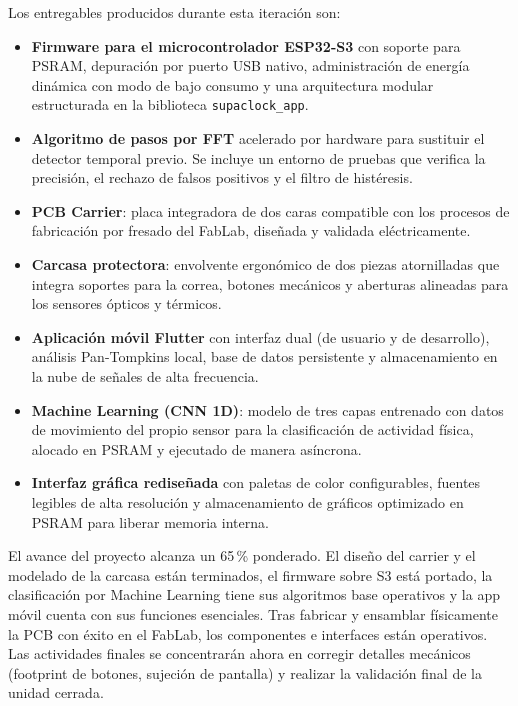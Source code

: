 \documentclass[letterpaper,11pt]{article}
\begin{document}
Los entregables producidos durante esta iteración son:
\begin{itemize}
    \item \textbf{Firmware para el microcontrolador ESP32-S3} con soporte para PSRAM, depuración por puerto USB nativo, administración de energía dinámica con modo de bajo consumo y una arquitectura modular estructurada en la biblioteca \texttt{supaclock\_app}.
    \item \textbf{Algoritmo de pasos por FFT} acelerado por hardware para sustituir el detector temporal previo. Se incluye un entorno de pruebas que verifica la precisión, el rechazo de falsos positivos y el filtro de histéresis.
    \item \textbf{PCB Carrier}: placa integradora de dos caras compatible con los procesos de fabricación por fresado del FabLab, diseñada y validada eléctricamente.
    \item \textbf{Carcasa protectora}: envolvente ergonómico de dos piezas atornilladas que integra soportes para la correa, botones mecánicos y aberturas alineadas para los sensores ópticos y térmicos.
    \item \textbf{Aplicación móvil Flutter} con interfaz dual (de usuario y de desarrollo), análisis Pan-Tompkins local, base de datos persistente y almacenamiento en la nube de señales de alta frecuencia.
    \item \textbf{Machine Learning (CNN 1D)}: modelo de tres capas entrenado con datos de movimiento del propio sensor para la clasificación de actividad física, alocado en PSRAM y ejecutado de manera asíncrona.
    \item \textbf{Interfaz gráfica rediseñada} con paletas de color configurables, fuentes legibles de alta resolución y almacenamiento de gráficos optimizado en PSRAM para liberar memoria interna.
\end{itemize}

El avance del proyecto alcanza un 65\,\% ponderado. El diseño del carrier y el modelado de la carcasa están terminados, el firmware sobre S3 está portado, la clasificación por Machine Learning tiene sus algoritmos base operativos y la app móvil cuenta con sus funciones esenciales. Tras fabricar y ensamblar físicamente la PCB con éxito en el FabLab, los componentes e interfaces están operativos. Las actividades finales se concentrarán ahora en corregir detalles mecánicos (footprint de botones, sujeción de pantalla) y realizar la validación final de la unidad cerrada.

\newpage
\end{document}
